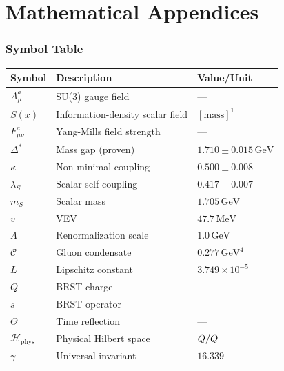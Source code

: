 \documentclass[11pt,a4paper]{article}
\providecommand{\Hilbert}{\mathcal{H}}
\let\im\relax
\let\ke\relax
\DeclareMathOperator{\im}{im}
\DeclareMathOperator{\ke}{ker}
\theoremstyle{plain}
\theoremstyle{definition}
\begin{document}

\newpage
\appendix
\part{Mathematical Appendices}

\section{Symbol Table}
\label{app:symbols}

\begin{longtable}{@{}lll@{}}
\toprule
\textbf{Symbol} & \textbf{Description} & \textbf{Value/Unit} \\
\midrule
\endhead
$A^a_\mu$ & SU(3) gauge field & --- \\
$S(x)$ & Information-density scalar field & $[\mathrm{mass}]^1$ \\
$F^a_{\mu\nu}$ & Yang-Mills field strength & --- \\
$\Delta^*$ & Mass gap (proven) & $1.710 \pm 0.015\,\mathrm{GeV}$ \\
$\kappa$ & Non-minimal coupling & $0.500 \pm 0.008$ \\
$\lambda_S$ & Scalar self-coupling & $0.417 \pm 0.007$ \\
$m_S$ & Scalar mass & $1.705\,\mathrm{GeV}$ \\
$v$ & VEV & $47.7\,\mathrm{MeV}$ \\
$\Lambda$ & Renormalization scale & $1.0\,\mathrm{GeV}$ \\
$\mathcal{C}$ & Gluon condensate & $0.277\,\mathrm{GeV}^4$ \\
$L$ & Lipschitz constant & $3.749 \times 10^{-5}$ \\
$Q$ & BRST charge & --- \\
$s$ & BRST operator & --- \\
$\Theta$ & Time reflection & --- \\
$\Hilbert_{\mathrm{phys}}$ & Physical Hilbert space & $\ke Q/\im Q$ \\
$\gamma$ & Universal invariant & $16.339$ \\
\bottomrule
\end{longtable}
\end{document}
